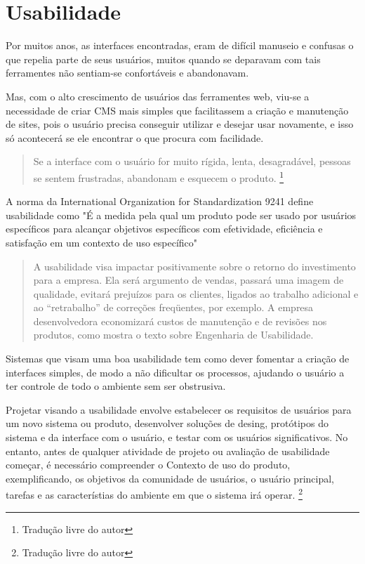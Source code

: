 \chapter{Usabilidade}

Por muitos anos, as interfaces encontradas, eram de difícil manuseio e confusas o que repelia parte de seus usuários, muitos quando se deparavam com tais ferramentes não sentiam-se confortáveis e abandonavam.

Mas, com o alto crescimento de usuários das ferramentes web, viu-se a necessidade de criar CMS mais simples que facilitassem a criação e manutenção de sites, pois o usuário precisa conseguir utilizar e desejar usar novamente, e isso só acontecerá se ele encontrar o que procura com facilidade.

\begin{quote} 
Se a interface com o usuário for muito rígida, lenta, desagradável, pessoas se sentem frustradas, abandonam e esquecem o produto.
\cite{usability_evaluation_learning}\footnote{Tradução livre do autor}
\end{quote}

A norma da International Organization for Standardization 9241 define usabilidade como "É a medida pela qual um produto pode ser usado por usuários específicos para alcançar objetivos específicos com efetividade, eficiência e satisfação em um contexto de uso específico"

\begin {quote}
A usabilidade visa impactar positivamente sobre o retorno do investimento para a empresa. Ela será argumento de vendas, passará uma imagem de qualidade, evitará prejuízos para os clientes, ligados ao trabalho adicional e ao “retrabalho” de correções freqüentes, por exemplo. A empresa desenvolvedora economizará custos de manutenção e de revisões nos produtos, como mostra o texto sobre Engenharia de Usabilidade.
\cite{nielsen_usabilidade}
\end{quote}

Sistemas que visam uma boa usabilidade tem como dever fomentar a criação de interfaces simples, de modo a não dificultar os processos, ajudando o usuário a ter controle de todo o ambiente sem ser obstrusiva.

Projetar visando a usabilidade envolve estabelecer os requisitos de usuários para um novo sistema ou produto, desenvolver soluções de desing, protótipos do sistema e da interface com o usuário, e testar com os usuários significativos. No entanto, antes de qualquer atividade de projeto ou avaliação de usabilidade começar, é necessário compreender o Contexto de uso do produto, exemplificando, os objetivos da comunidade de usuários, o usuário principal, tarefas e as característias do ambiente em que o sistema irá operar.
\cite{maguire_context_of_use}\footnote{Tradução livre do autor}


